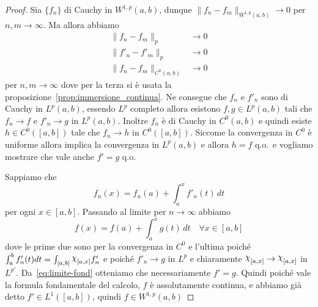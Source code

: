 \begin{proof}
    Sia \(\{f_{n}\} \) di Cauchy in \(W^{1,p}{(a,b)}\), dunque
    \(\|f_{n}-f_{m}\|_{W^{1,p}{(a,b)}} \to 0\) per \(n,m \to \infty\). Ma allora
    abbiamo
    \begin{align*}
        \|f_{n}-f_{m}\|_p &\to 0 \\
        \|f'_n - f'_m\|_p &\to 0 \\
        \|f_n - f_m\|_{C^{0}{(a,b)}} &\to 0
    \end{align*}
    per \(n,m \to \infty\) dove per la terza si è usata la
    proposizione~\eqref{prop:immersione_continua}. Ne consegue che \(f_{n}\) e \(f'_n\) sono di Cauchy in
    \(L^{p}{(a,b)}\), essendo \(L^{p}\) completo allora esistono \(f,g \in
    L^{p}{(a,b)}\) tali che \(f_{n} \to f\) e \(f'_{n} \to g\) in
    \(L^{p}{(a,b)}\). Inoltre \(f_{n}\) è di Cauchy in \(C^{0}{(a,b)}\) e quindi
    esiste \(h \in C^{0}{([a,b])}\) tale che \(f_{n} \to h\) in
    \(C^{0}{([a,b])}\). Siccome la convergenza in \(C^{0}\) è uniforme allora
    implica la convergenza in \(L^{p}{(a,b)}\) e allora \(h = f\) q.o.~e
    vogliamo mostrare che vale anche \(f' = g\) q.o.

    Sappiamo che \[f_{n}{(x)} = f_{n}{(a)} + \int_a^{x}{f'_n{(t)}}\,dt\] per
    ogni \(x \in [a,b]\). Passando al limite per \(n \to \infty\) abbiamo
    \begin{equation}\label{eq:limite-fond}
        f{(x)} = f{(a)} + \int_a^{x}{g{(t)}}\,dt \quad \forall x \in [a,b]
    \end{equation}
    dove le prime due sono per la convergenza in \(C^{0}\) e l'ultima poiché
    \(\int_a^{b} f'_n{(t)} dt = \int_{[a,b]} \rchi_{[a, x]} f'_n \) e poiché
    \(f'_n \to g\) in \(L^{p}\) e chiaramente \(\rchi_{[a,x]} \to \rchi_{[a,x]}
    \) in \(L^{p'}\). Da~\eqref{eq:limite-fond} otteniamo che necessariamente
    \(f' =g\). Quindi poiché vale la formula fondamentale del calcolo, \(f\) è
    assolutamente continua, e abbiamo già detto \(f' \in L^{1}{([a,b])}\),
    quindi \(f \in W^{1, p}{(a,b)}\) 
\end{proof}

